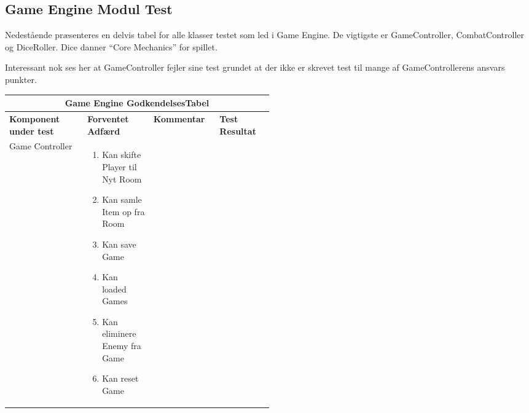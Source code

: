 \subsection{Game Engine Modul Test}

Nedestående præsenteres en delvis tabel for alle klasser testet som led i Game Engine. De vigtigste er GameController, CombatController og DiceRoller. Dice danner ``Core Mechanics'' for spillet.

Interessant nok ses her at GameController fejler sine test grundet at der ikke er skrevet test til mange af GameControllerens ansvars punkter.

\begin{center}
  \vspace{-1em}
  \label{tab:testEngine}
  \begin{longtable}{|l|p{0.25\linewidth}|p{0.25\linewidth}|l|}
  \hline
  \multicolumn{4}{|c|}{\textbf{Game Engine GodkendelsesTabel}} \\ \hline
  \textbf{Komponent under test} & \textbf{Forventet Adfærd} & \textbf{Kommentar} & \textbf{Test Resultat} \\ \hline
  Game Controller
  &
    \begin{enumerate}
      \item \begin{flushleft} Kan skifte Player til Nyt Room \end{flushleft}
      \item \begin{flushleft} Kan samle Item op fra Room  \end{flushleft}
      \item \begin{flushleft} Kan save Game \end{flushleft}
      \item \begin{flushleft} Kan loaded Games \end{flushleft}
      \item \begin{flushleft} Kan eliminere Enemy fra Game \end{flushleft}
      \item \begin{flushleft} Kan reset Game \end{flushleft}

\end{enumerate}
\end{longtable}
\end{center}
